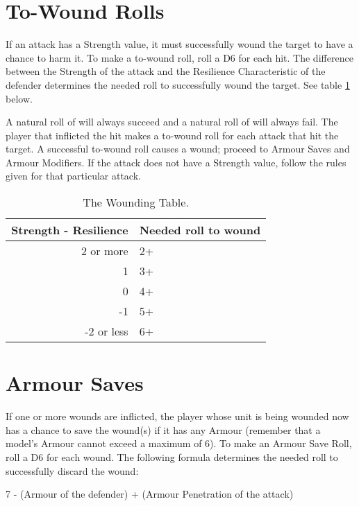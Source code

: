 \section{To-Wound Rolls}
\label{to_wound_rolls}

If an attack has a Strength value, it must successfully wound the target to have a chance to harm it. To make a to-wound roll, roll a D6 for each hit. The difference between the Strength of the attack and the Resilience Characteristic of the defender determines the needed roll to successfully wound the target. See table \ref{table/the_wounding_table} below.

A natural roll of  will always succeed and a natural roll of  will always fail. The player that inflicted the hit makes a to-wound roll for each attack that hit the target. A successful to-wound roll causes a wound; proceed to Armour Saves and Armour Modifiers. If the attack does not have a Strength value, follow the rules given for that particular attack.


\begin{table}[!htbp]
\centering
  \begin{tabular}{r l}
    Strength - Resilience & Needed roll to wound \\
    \midrule
    2 or more & 2+\\
    1 & 3+ \\
    0 & 4+ \\
    -1 & 5+ \\
    -2 or less & 6+\\
  \end{tabular}
 \caption{The Wounding Table.}
 \label{table/the_wounding_table}
\end{table}

\section{Armour Saves}
\label{armour_saves}

If one or more wounds are inflicted, the player whose unit is being wounded now has a chance to save the wound(s) if it has any Armour (remember that a model's Armour cannot exceed a maximum of 6). To make an Armour Save Roll, roll a D6 for each wound. The following formula determines the needed roll to successfully discard the wound:
\begin{center}
7 - (Armour of the defender) + (Armour Penetration of the attack)
\end{center}

